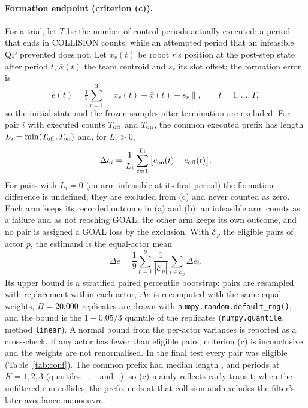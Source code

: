 \documentclass[11pt]{article}
\begin{document}
\paragraph{Formation endpoint (criterion (c)).} For a trial, let $T$ be the number of control
periods actually executed: a period that ends in COLLISION counts, while an attempted period that an
infeasible QP prevented does not. Let $x_r(t)$ be robot $r$'s position at the post-step state after
period $t$, $\bar x(t)$ the team centroid and $s_r$ its slot offset; the formation error is
\begin{equation}
e(t)=\tfrac13\textstyle\sum_{r=1}^{3}\big\|x_r(t)-\bar x(t)-s_r\big\|,\qquad t=1,\dots,T,
\end{equation}
so the initial state and the frozen samples after termination are excluded. For pair $i$ with
executed counts $T_{\rm off}$ and $T_{\rm on}$, the common executed prefix has length
$L_i=\min(T_{\rm off},T_{\rm on})$ and, for $L_i>0$,
\begin{equation}
\Delta e_i=\frac1{L_i}\sum_{t=1}^{L_i}\big[e_{\rm on}(t)-e_{\rm off}(t)\big].
\end{equation}
For pairs with $L_i=0$ (an arm infeasible at its first period) the formation difference is undefined;
they are excluded from (c) and never counted as zero. Each arm keeps its recorded outcome in (a) and
(b): an infeasible arm counts as a failure and as not reaching GOAL, the other arm keeps its own
outcome, and no pair is assigned a GOAL loss by the exclusion. With $\mathcal E_p$
the eligible pairs of actor $p$, the estimand is the equal-actor mean
\begin{equation}
\overline{\Delta e}=\frac19\sum_{p=1}^{9}\frac1{|\mathcal E_p|}\sum_{i\in\mathcal E_p} \Delta e_i .
\end{equation}
Its upper bound is a stratified paired percentile bootstrap: pairs are resampled with replacement
within each actor, $\overline{\Delta e}$ is recomputed with the same equal weights, $B=20{,}000$ replicates are
drawn with \texttt{numpy.random.default\_rng(\BootSeed)}, and the bound is the $1-0.05/3$ quantile of
the replicates (\texttt{numpy.quantile}, method \texttt{linear}). A normal bound from the per-actor
variances is reported as a cross-check. If any actor has fewer than \MinEligible{} eligible pairs,
criterion (c) is inconclusive and the weights are not renormalised. In the final test every pair was
eligible (Table~\ref{tab:conf}). The common prefix had median length \LMedone, \LMedtwo{} and
\LMedthree{} periods at $K=1,2,3$ (quartiles \LQloone--\LQhione, \LQlotwo--\LQhitwo{} and
\LQlothree--\LQhithree), so (c) mainly reflects early transit; when the unfiltered run collides, the
prefix ends at that collision and excludes the filter's later avoidance manoeuvre.
\end{document}
